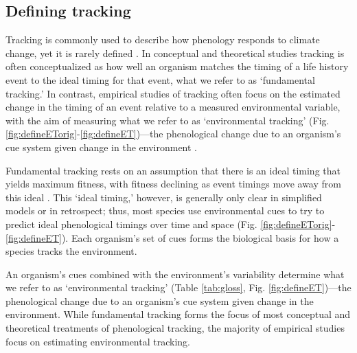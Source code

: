 \documentclass[11pt,letterpaper]{article}
\begin{document}
\subsection{Defining tracking}
Tracking is commonly used to describe how phenology responds to climate change, yet it is rarely defined \citep[e.g.,][]{Menzel:2006xn,Parmesan:2006cr,Cleland:2012,deacy2018}. In conceptual and theoretical studies tracking is often conceptualized as how well an organism matches the timing of a life history event to the ideal timing for that event, what we refer to as `fundamental tracking.' In contrast, empirical studies of tracking often focus on the estimated change in the timing of an event relative to a measured environmental variable, with the aim of measuring what we refer to as `environmental tracking' (Fig. \ref{fig:defineETorig}-\ref{fig:defineET})---the phenological change due to an organism's cue system given change in the environment \citep[though most studies lack the required knowledge of the underlying cue system,][]{chmura2019}. 

Fundamental tracking rests on an assumption that there is an ideal timing that yields maximum fitness, with fitness declining as event timings move away from this ideal \citep[a foundational concept of the trophic mismatch literature,][]{vissergienapp2019}. This `ideal timing,' however, is generally only clear in simplified models or in retrospect; thus, most species use environmental cues to try to predict ideal phenological timings over time and space (Fig. \ref{fig:defineETorig}-\ref{fig:defineET}). Each organism's set of cues forms the biological basis for how a species tracks the environment.

An organism's cues combined with the environment's variability determine what we refer to as `environmental tracking' (Table \ref{tab:gloss}, Fig. \ref{fig:defineET})---the phenological change due to an organism's cue system given change in the environment. While fundamental tracking forms the focus of most conceptual and theoretical treatments of phenological tracking, the majority of  empirical studies focus on estimating environmental tracking. 
\end{document}
